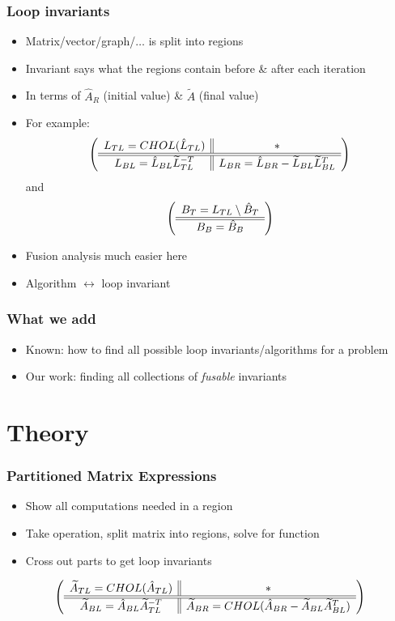 \documentclass{beamer}
\begin{document}
\begin{frame}
  \frametitle{Loop invariants}
  \begin{itemize}
  \item Matrix/vector/graph/$\ldots$ is split into regions
  \item Invariant says what the regions contain before \& after each iteration
  \item In terms of $\hat{A}_R$ (initial value) \& $\widetilde{A}$ (final value)
  \item For example:
    \begin{equation*}
      \left( \begin{array}{c || c} L_{TL} = CHOL(\hat{L}_{TL}) & * \\ \hline \hline L_{BL} = \hat{L}_{BL}\widetilde{L}_{TL}^{-T} & L_{BR} = \hat{L}_{BR} - \widetilde{L}_{BL}\widetilde{L}_{BL}^T \end{array} \right)
    \end{equation*}
    and
    \begin{equation*}
      \left( \begin{array}{c} B_T = L_{TL} \setminus \hat{B}_T \\ \hline \hline B_B = \hat{B}_B \end{array} \right)
    \end{equation*}
  \item Fusion analysis much easier here
  \item Algorithm $\leftrightarrow$ loop invariant
  \end{itemize}
\end{frame}

\begin{frame}
  \frametitle{What we add}
  \begin{itemize}
  \item Known: how to find all possible loop invariants/algorithms for a problem
  \item Our work: finding all collections of \emph{fusable} invariants
  \end{itemize}
\end{frame}

\section{Theory}
\frame{\sectionpage}

\begin{frame}
  \frametitle{Partitioned Matrix Expressions}
  \begin{itemize}
  \item Show all computations needed in a region
  \item Take operation, split matrix into regions, solve for function
  \item Cross out parts to get loop invariants
  \end{itemize}
  \begin{equation*}
    \left( \begin{array}{c || c} \widetilde{A}_{TL} = CHOL(\hat{A}_{TL}) & * \\ \hline \hline \widetilde{A}_{BL} = \hat{A}_{BL}\widetilde{A}_{TL}^{-T} & \widetilde{A}_{BR} = CHOL(\hat{A}_{BR} - \widetilde{A}_{BL}\widetilde{A}_{BL}^T) \end{array} \right)
  \end{equation*}
\end{frame}
\end{document}

